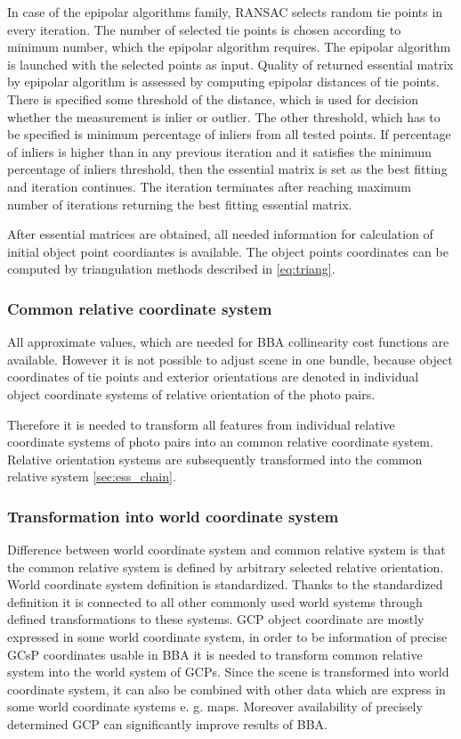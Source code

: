 \documentclass[a4paper,12pt]{article}
\begin{document}
In case of the epipolar algorithms family, RANSAC selects random tie points in every iteration.
The number of selected tie points is chosen according to minimum number, which the epipolar algorithm requires.
The epipolar algorithm is launched with the selected points as input. 
Quality of returned essential matrix by epipolar algorithm is assessed by 
computing epipolar distances of tie points. There is specified some threshold of the distance, which is used 
for decision whether the measurement is inlier or outlier. The other threshold, which has to be specified 
is minimum percentage of inliers from all tested points. If percentage of inliers is higher than in any previous iteration
and it satisfies the minimum percentage of inliers threshold, then
the essential matrix is set as the best fitting and iteration continues. The iteration terminates after 
reaching maximum number of iterations returning the best fitting essential matrix.

After essential matrices are obtained, all needed information for calculation of initial object point coordiantes
is  available. The object points coordinates can be computed by triangulation methods described in \ref{eq:triang}.


\subsubsection{Common relative coordinate system}

All approximate values, which are needed for BBA collinearity cost functions are available. 
However it is not possible to adjust scene in one bundle, because
object coordinates of tie points and exterior orientations are denoted in  individual object coordinate systems
of relative orientation of the photo pairs.

Therefore it is needed to transform all features from individual relative coordinate systems of photo pairs into 
an common relative coordinate system.
Relative orientation systems are subsequently transformed into the common relative system \ref{sec:ess_chain}. 

\subsubsection{Transformation into world coordinate system}
Difference between world coordinate system and common relative system is that the common relative system 
is defined by arbitrary selected relative orientation. World coordinate system definition is standardized.
Thanks to the standardized definition it is connected to all other commonly used  world systems through 
defined transformations to these systems.
GCP object coordinate are mostly expressed in some world coordinate system, in order to be 
information of precise GCsP coordinates usable in BBA it is needed to transform common relative 
system into the world system of GCPs. Since the scene is transformed into world coordinate system,
it can also be combined with other data which are express in some world coordinate systems e. g.
maps. Moreover availability of precisely determined GCP can significantly improve results of BBA.  
\end{document}
